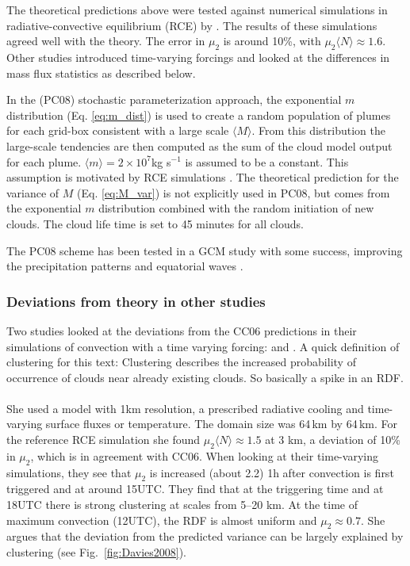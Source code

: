 \documentclass[a4paper, 12pt]{article}
\begin{document}
The theoretical predictions above were tested against numerical simulations in radiative-convective equilibrium (RCE) by \cite{Cohen2006}. The results of these simulations agreed well with the theory. The error in $\mu_2$ is around 10\%, with $\mu_2 \langle N \rangle \approx 1.6$. Other studies introduced time-varying forcings and looked at the differences in mass flux statistics as described below.

In the \cite{Plant2008}(PC08) stochastic parameterization approach, the exponential $m$ distribution (Eq. \ref{eq:m_dist}) is used to create a random population of plumes for each grid-box consistent with a large scale $\langle M \rangle$. From this distribution the large-scale tendencies are then computed as the sum of the cloud model output for each plume. $\langle m \rangle = 2 \times 10^7$kg s$^{-1}$ is assumed to be a constant. This assumption is motivated by RCE simulations \citep[e.g.][]{Cohen2006}. The theoretical prediction for the variance of $M$ (Eq. \ref{eq:M_var}) is not explicitly used in PC08, but comes from the exponential $m$ distribution combined with the random initiation of new clouds. The cloud life time is set to 45 minutes for all clouds. 

The PC08 scheme has been tested in a GCM study with some success, improving the precipitation patterns and equatorial waves \citep{Wang2016}.

\subsubsection{Deviations from theory in other studies}
Two studies looked at the deviations from the CC06 predictions in their simulations of convection with a time varying forcing: \cite{Davies2008} and \cite{Davoudi2010}. A quick definition of clustering for this text: Clustering describes the increased probability of occurrence of clouds near already existing clouds. So basically a spike in an RDF. 

\paragraph{\cite{Davies2008}}
She used a model with 1km resolution, a prescribed radiative cooling and time-varying surface fluxes or temperature. The domain size was 64\,km by 64\,km. For the reference RCE simulation she found $\mu_2 \langle N \rangle \approx 1.5$ at 3 km, a deviation of 10\% in $\mu_2$, which is in agreement with CC06. When looking at their time-varying simulations, they see that $\mu_2$ is increased (about 2.2) 1h after convection is first triggered and at around 15UTC. They find that at the triggering time and at 18UTC there is strong clustering at scales from 5--20 km. At the time of maximum convection (12UTC), the RDF is almost uniform and $\mu_2 \approx 0.7$. She argues that the deviation from the predicted variance can be largely explained by clustering (see Fig.~\ref{fig:Davies2008}). 
\end{document}
